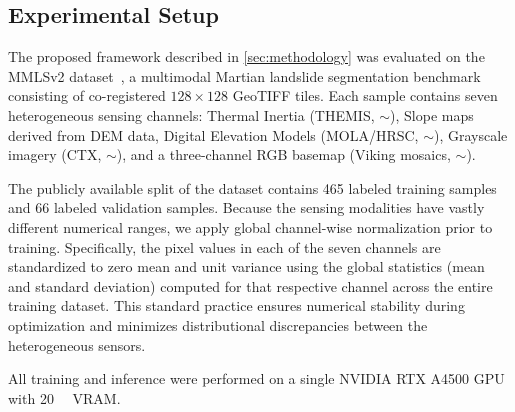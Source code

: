 \subsection{Experimental Setup}
\label{sec:exp-setup}

The proposed framework described in \cref{sec:methodology} was evaluated on the MMLSv2 dataset~\cite{mmlsv2_2026}, a multimodal Martian landslide segmentation benchmark consisting of co-registered $128 \times 128$ GeoTIFF tiles. Each sample contains seven heterogeneous sensing channels: Thermal Inertia (THEMIS, $\sim$), Slope maps derived from DEM data, Digital Elevation Models (MOLA/HRSC, $\sim$), Grayscale imagery (CTX, $\sim$), and a three-channel RGB basemap (Viking mosaics, $\sim$).

The publicly available split of the dataset contains 465 labeled training samples and 66 labeled validation samples. Because the sensing modalities have vastly different numerical ranges, we apply global channel-wise normalization prior to training. Specifically, the pixel values in each of the seven channels are standardized to zero mean and unit variance using the global statistics (mean and standard deviation) computed for that respective channel across the entire training dataset. This standard practice ensures numerical stability during optimization and minimizes distributional discrepancies between the heterogeneous sensors.

All training and inference were performed on a single NVIDIA RTX A4500 GPU with \qty{20}{\giga\byte} VRAM.
